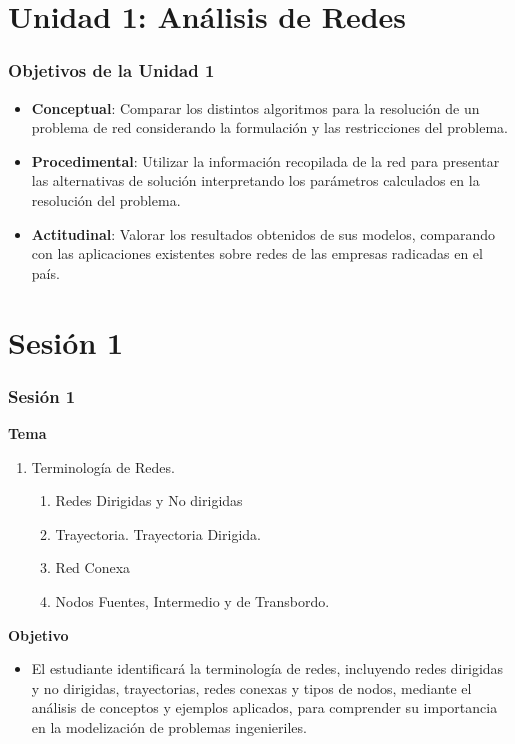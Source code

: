 \documentclass{beamer}
\begin{document}
\section{Unidad 1: Análisis de Redes}
\begin{frame}
\frametitle{Objetivos de la Unidad 1}
\begin{itemize}
    \item \textbf{Conceptual}:  Comparar los distintos algoritmos para la resolución de un problema de red considerando la formulación y las restricciones del problema.
    \item \textbf{Procedimental}: Utilizar la información recopilada de la red para presentar las alternativas de solución interpretando los parámetros calculados en la resolución del problema.
    \item \textbf{Actitudinal}: Valorar los resultados obtenidos de sus modelos, comparando con las aplicaciones existentes sobre redes de las empresas radicadas en el país.
\end{itemize}
\end{frame}

\section{Sesión 1}
\begin{frame}
\frametitle{Sesión 1}

\textbf{Tema}
\begin{enumerate}
\item Terminología de Redes.
\begin{enumerate}
\item Redes Dirigidas y No dirigidas
\item  Trayectoria. Trayectoria Dirigida.
\item  Red Conexa
\item Nodos Fuentes, Intermedio y de Transbordo.
\end{enumerate}
\end{enumerate}
\textbf{Objetivo}
\begin{itemize}
    \item El estudiante identificará la terminología de redes, incluyendo redes dirigidas y no dirigidas, trayectorias, redes conexas y tipos de nodos, mediante el análisis de conceptos y ejemplos aplicados, para comprender su importancia en la modelización de problemas ingenieriles.
\end{itemize}
\end{frame}
\end{document}
